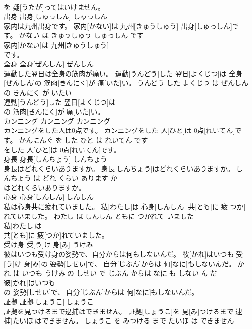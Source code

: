 \documentclass[8pt]{extreport}
\begin{document}
\begin{CJK}{UTF8}{min}
\\	を 疑[うたが]ってはいけません。			
\\	出身	出身[しゅっしん]	しゅっしん	
\\	家内は九州出身です。	家内[かない]は 九州[きゅうしゅう] 出身[しゅっしん]です。	かない は きゅうしゅう しゅっしん です	
\\	家内[かない]は 九州[きゅうしゅう]
\\	です。			
\\	全身	全身[ぜんしん]	ぜんしん	
\\	運動した翌日は全身の筋肉が痛い。	運動[うんどう]した 翌日[よくじつ]は 全身[ぜんしん]の 筋肉[きんにく]が 痛[いた]い。	うんどう した よくじつ は ぜんしん の きんにく が いたい	
\\	運動[うんどう]した 翌日[よくじつ]は
\\	の 筋肉[きんにく]が 痛[いた]い。			
\\	カンニング	カンニング	カンニング	
\\	カンニングをした人は0点です。	カンニングをした 人[ひと]は 0点[れいてん]です。	かんにんぐ を した ひと は れいてん です	
\\	をした 人[ひと]は 0点[れいてん]です。			
\\	身長	身長[しんちょう]	しんちょう	
\\	身長はどれくらいありますか。	身長[しんちょう]はどれくらいありますか。	しんちょう は どれ くらい あります か	
\\	はどれくらいありますか。			
\\	心身	心身[しんしん]	しんしん	
\\	私は心身共に疲れていました。	私[わたし]は 心身[しんしん] 共[とも]に 疲[つか]れていました。	わたし は しんしん ともに つかれて いました	
\\	私[わたし]は
\\	共[とも]に 疲[つか]れていました。			
\\	受け身	受[う]け 身[み]	うけみ	
\\	彼はいつも受け身の姿勢で、自分からは何もしないんだ。	彼[かれ]はいつも 受[う]け 身[み]の 姿勢[しせい]で、 自分[じぶん]からは 何[なに]もしないんだ。	かれ は いつも うけみ の しせい で じぶん からは なに も しない ん だ	
\\	彼[かれ]はいつも
\\	の 姿勢[しせい]で、 自分[じぶん]からは 何[なに]もしないんだ。			
\\	証拠	証拠[しょうこ]	しょうこ	
\\	証拠を見つけるまで逮捕はできません。	証拠[しょうこ]を 見[み]つけるまで 逮捕[たいほ]はできません。	しょうこ を みつける まで たいほ は できません	

\end{CJK}
\end{document}
